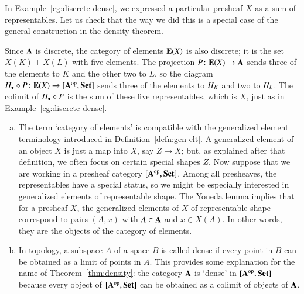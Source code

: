 \begin{example}
In Example~\ref{eg:discrete-dense}, we expressed a particular presheaf $X$
as a sum of representables.  Let us check that the way we did this is a
special case of the general construction in the density theorem.

Since $\mathbf{A}$ is discrete, the category of elements $\mathbf{E}(X)$ is also
discrete; it is the set $X(K) + X(L)$ with five elements.  The projection
$P\from \elt{X} \to \scat{A}$ sends three of the elements to $K$ and the
other two to $L$, so the diagram $\h_\bl \of P\from \elt{X} \to
\pshf{\scat{A}}$ sends three of the elements to $H_K$ and two to $H_L$.
The colimit of $H_\bullet \mathbin{\circ} P$ is the sum of these five representables,
which is $X$, just as in Example~\ref{eg:discrete-dense}.
\end{example}

\begin{remarks}
\begin{enumerate}[(b)]
\item
The term `category of elements'%
%
%
%
is compatible with the generalized%
%
%
element terminology introduced in Definition~\ref{defn:gen-elt}.  A
generalized element of an object $X$ is just a map into $X$, say $Z \to X$;
but, as explained after that definition, we often focus on certain special
shapes $Z$.  Now suppose that we are working in a presheaf category
$[\mathbf{A}^{\mathrm{op}},\mathbf{Set}]$.  Among all presheaves, the representables have a special
status, so we might be especially interested in generalized elements of
representable shape.  The Yoneda lemma implies that for a presheaf $X$, the
generalized elements of $X$ of representable shape correspond to pairs $(A,
x)$ with $A \in \mathbf{A}$ and $x \in X(A)$.  In other words, they are the
objects of the category of elements.

\item
In topology, a subspace $A$ of a space $B$ is called dense%
%
%
if every point in $B$ can be obtained as a limit of points in $A$.  This
provides some explanation for the name of Theorem~\ref{thm:density}: the
category $\mathbf{A}$ is `dense' in $[\mathbf{A}^{\mathrm{op}},\mathbf{Set}]$ because every object of
$[\mathbf{A}^{\mathrm{op}},\mathbf{Set}]$ can be obtained as a colimit of objects of $\mathbf{A}$.
%
%
%
%
\end{enumerate}
\end{remarks}


